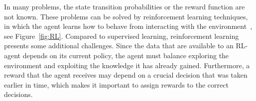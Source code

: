 
In many problems, the state transition probabilities or the reward function are not known. These problems can be solved by reinforcement learning techniques, in which the agent learns how to behave from interacting with the environment~\cite[Ch. 5]{Kochenderfer2015}, see Figure~\ref{fig:RL}. Compared to supervised learning, reinforcement learning presents some additional challenges. Since the data that are available to an RL-agent depends on its current policy, the agent must balance exploring the environment and exploiting the knowledge it has already gained. Furthermore, a reward that the agent receives may depend on a crucial decision that was taken earlier in time, which makes it important to assign rewards to the correct decisions.




